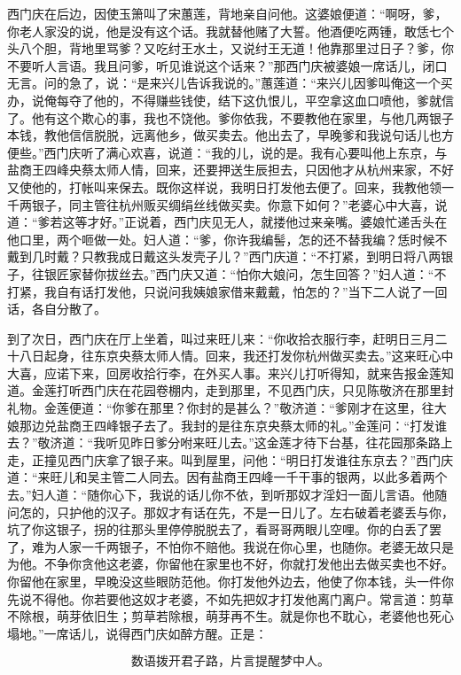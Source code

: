 西门庆在后边，因使玉箫叫了宋蕙莲，背地亲自问他。这婆娘便道：“啊呀，爹，你老人家没的说，他是没有这个话。我就替他赌了大誓。他酒便吃两锺，敢恁七个头八个胆，背地里骂爹？又吃纣王水土，又说纣王无道！他靠那里过日子？爹，你不要听人言语。我且问爹，听见谁说这个话来？”那西门庆被婆娘一席话儿，闭口无言。问的急了，说：“是来兴儿告诉我说的。”蕙莲道：“来兴儿因爹叫俺这一个买办，说俺每夺了他的，不得赚些钱使，结下这仇恨儿，平空拿这血口喷他，爹就信了。他有这个欺心的事，我也不饶他。爹你依我，不要教他在家里，与他几两银子本钱，教他信信脱脱，远离他乡，做买卖去。他出去了，早晚爹和我说句话儿也方便些。”西门庆听了满心欢喜，说道：“我的儿，说的是。我有心要叫他上东京，与盐商王四峰央蔡太师人情，回来，还要押送生辰担去，只因他才从杭州来家，不好又使他的，打帐叫来保去。既你这样说，我明日打发他去便了。回来，我教他领一千两银子，同主管往杭州贩买绸绢丝线做买卖。你意下如何？”老婆心中大喜，说道：“爹若这等才好。”正说着，西门庆见无人，就搂他过来亲嘴。婆娘忙递舌头在他口里，两个咂做一处。妇人道：“爹，你许我编髻，怎的还不替我编？恁时候不戴到几时戴？只教我成日戴这头发壳子儿？”西门庆道：“不打紧，到明日将八两银子，往银匠家替你拔丝去。”西门庆又道：“怕你大娘问，怎生回答？”妇人道：“不打紧，我自有话打发他，只说问我姨娘家借来戴戴，怕怎的？”当下二人说了一回话，各自分散了。

到了次日，西门庆在厅上坐着，叫过来旺儿来：“你收拾衣服行李，赶明日三月二十八日起身，往东京央蔡太师人情。回来，我还打发你杭州做买卖去。”这来旺心中大喜，应诺下来，回房收拾行李，在外买人事。来兴儿打听得知，就来告报金莲知道。金莲打听西门庆在花园卷棚内，走到那里，不见西门庆，只见陈敬济在那里封礼物。金莲便道：“你爹在那里？你封的是甚么？”敬济道：“爹刚才在这里，往大娘那边兑盐商王四峰银子去了。我封的是往东京央蔡太师的礼。”金莲问：“打发谁去？”敬济道：“我听见昨日爹分咐来旺儿去。”这金莲才待下台基，往花园那条路上走，正撞见西门庆拿了银子来。叫到屋里，问他：“明日打发谁往东京去？”西门庆道：“来旺儿和吴主管二人同去。因有盐商王四峰一千干事的银两，以此多着两个去。”妇人道：“随你心下，我说的话儿你不依，到听那奴才淫妇一面儿言语。他随问怎的，只护他的汉子。那奴才有话在先，不是一日儿了。左右破着老婆丢与你，坑了你这银子，拐的往那头里停停脱脱去了，看哥哥两眼儿空哩。你的白丢了罢了，难为人家一千两银子，不怕你不赔他。我说在你心里，也随你。老婆无故只是为他。不争你贪他这老婆，你留他在家里也不好，你就打发他出去做买卖也不好。你留他在家里，早晚没这些眼防范他。你打发他外边去，他使了你本钱，头一件你先说不得他。你若要他这奴才老婆，不如先把奴才打发他离门离户。常言道：剪草不除根，萌芽依旧生；剪草若除根，萌芽再不生。就是你也不耽心，老婆他也死心塌地。”一席话儿，说得西门庆如醉方醒。正是：

\[
数语拨开君子路，片言提醒梦中人。
\]
